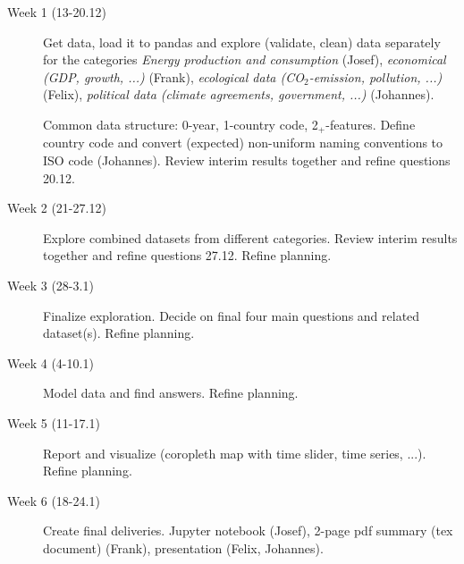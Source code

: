 \documentclass[a4paper,10pt]{scrartcl}
\begin{document}
\begin{description}

\item[Week 1 (13-20.12)]
Get data, load it to pandas and explore (validate, clean) data separately for the categories 
\emph{Energy production and consumption} (Josef), 
\emph{economical (GDP, growth, ...)} (Frank),
\emph{ecological data (CO$_2$-emission, pollution, ...)} (Felix),
\emph{political data (climate agreements, government, ...)} (Johannes).

Common data structure: 0-year, 1-country code, 2$_+$-features.
Define country code and convert (expected) non-uniform naming conventions to ISO code (Johannes).
Review interim results together and refine questions 20.12.


\item[Week 2 (21-27.12)]
Explore combined datasets from different categories.
Review interim results together and refine questions 27.12.
Refine planning.

\item[Week 3 (28-3.1)]
Finalize exploration.
Decide on final four main questions and related dataset(s).
Refine planning.

\item[Week 4 (4-10.1)]
Model data and find answers.
Refine planning.

\item[Week 5 (11-17.1)]
Report and visualize (coropleth map with time slider, time series, ...).
Refine planning.

\item[Week 6 (18-24.1)]
Create final deliveries.
Jupyter notebook (Josef),
2-page pdf summary (tex document) (Frank),
presentation (Felix, Johannes).

\end{description}
\end{document}

